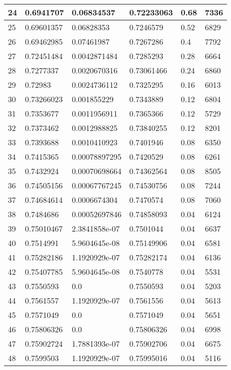 \begin{longtable}{|l|l|l|l|l|l|}
24 & 0.6941707 & 0.06834537 & 0.72233063 & 0.68 & 7336 \\ \hline 
25 & 0.69601357 & 0.06828353 & 0.7246579 & 0.52 & 6829 \\ \hline 
26 & 0.69462985 & 0.07461987 & 0.7267286 & 0.4 & 7792 \\ \hline 
27 & 0.72451484 & 0.0042871484 & 0.7285293 & 0.28 & 6664 \\ \hline 
28 & 0.7277337 & 0.0020670316 & 0.73061466 & 0.24 & 6860 \\ \hline 
29 & 0.72983 & 0.0024736112 & 0.7325295 & 0.16 & 6013 \\ \hline 
30 & 0.73266023 & 0.001855229 & 0.7343889 & 0.12 & 6804 \\ \hline 
31 & 0.7353677 & 0.0011956911 & 0.7365366 & 0.12 & 5729 \\ \hline 
32 & 0.7373462 & 0.0012988825 & 0.73840255 & 0.12 & 8201 \\ \hline 
33 & 0.7393688 & 0.0010410923 & 0.7401946 & 0.08 & 6350 \\ \hline 
34 & 0.7415365 & 0.00078897295 & 0.7420529 & 0.08 & 6261 \\ \hline 
35 & 0.7432924 & 0.00070698664 & 0.74362564 & 0.08 & 8505 \\ \hline 
36 & 0.74505156 & 0.00067767245 & 0.74530756 & 0.08 & 7244 \\ \hline 
37 & 0.74684614 & 0.0006674304 & 0.7470574 & 0.08 & 7060 \\ \hline 
38 & 0.7484686 & 0.00052697846 & 0.74858093 & 0.04 & 6124 \\ \hline 
39 & 0.75010467 & 2.3841858e-07 & 0.7501044 & 0.04 & 6637 \\ \hline 
40 & 0.7514991 & 5.9604645e-08 & 0.75149906 & 0.04 & 6581 \\ \hline 
41 & 0.75282186 & 1.1920929e-07 & 0.75282174 & 0.04 & 6136 \\ \hline 
42 & 0.75407785 & 5.9604645e-08 & 0.7540778 & 0.04 & 5531 \\ \hline 
43 & 0.7550593 & 0.0 & 0.7550593 & 0.04 & 5203 \\ \hline 
44 & 0.7561557 & 1.1920929e-07 & 0.7561556 & 0.04 & 5613 \\ \hline 
45 & 0.7571049 & 0.0 & 0.7571049 & 0.04 & 5651 \\ \hline 
46 & 0.75806326 & 0.0 & 0.75806326 & 0.04 & 6998 \\ \hline 
47 & 0.75902724 & 1.7881393e-07 & 0.75902706 & 0.04 & 6675 \\ \hline 
48 & 0.7599503 & 1.1920929e-07 & 0.75995016 & 0.04 & 5116 \\ \hline 

\end{longtable}
